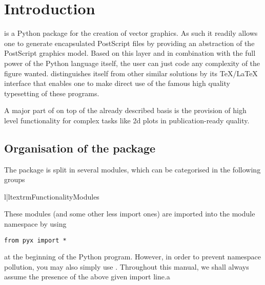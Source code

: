 \chapter{Introduction}
\label{intro}

\PyX{} is a Python package for the creation of vector graphics. As
such it readily allows one to generate encapsulated PostScript files
by providing an abstraction of the PostScript graphics model.  Based
on this layer and in combination with the full power of the Python
language itself, the user can just code any complexity of the figure
wanted. \PyX{} distinguishes itself from other similar solutions by
its \TeX{}/\LaTeX{} interface that enables one to make direct use of
the famous high quality typesetting of these programs.

A major part of \PyX{} on top of the already described basis is the
provision of high level functionality for complex tasks like 2d plots
in publication-ready quality.

\section{Organisation of the \PyX{} package}

The \PyX{} package is split in several modules, which can be
categorised in the following groups

\begin{tableii}{l|l}{textrm}{Functionality}{Modules}
\end{tableii}

These modules (and some other less import ones) are imported into the
module namespace by using 
\begin{verbatim}
from pyx import *
\end{verbatim}
at the beginning of the Python program.  However, in order to prevent
namespace pollution, you may also simply use .
Throughout this manual, we shall always assume the presence of the
above given import line.a



